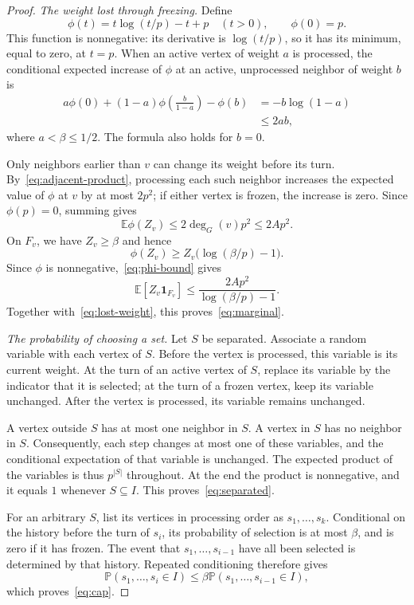 \documentclass[11pt]{article}
\numberwithin{equation}{section}
\theoremstyle{remark}
\newcommand{\E}{\mathbb E}
\newcommand{\Pp}{\mathbb P}
\newcommand{\ind}{\mathbf 1}
\begin{document}
\begin{proof}
\smallskip
\noindent\emph{The weight lost through freezing.}
Define
\[
 \phi(t)=t\log(t/p)-t+p\quad(t>0),\qquad\phi(0)=p.
\]
This function is nonnegative: its derivative is $\log(t/p)$, so it has its minimum, equal to zero, at $t=p$. When an active vertex of weight $a$ is processed, the conditional expected increase of $\phi$ at an active, unprocessed neighbor of weight $b$ is
\begin{align*}
 a\phi(0)+(1-a)\phi\!\left(\frac{b}{1-a}\right)-\phi(b)
 &=-b\log(1-a)\\
 &\le2ab,
\end{align*}
where $a<\beta\le1/2$. The formula also holds for $b=0$.

Only neighbors earlier than $v$ can change its weight before its turn. By~\eqref{eq:adjacent-product}, processing each such neighbor increases the expected value of $\phi$ at $v$ by at most $2p^2$; if either vertex is frozen, the increase is zero. Since $\phi(p)=0$, summing gives
\begin{equation}\label{eq:phi-bound}
 \E\phi(Z_v)\le2\deg_G(v)p^2\le2Ap^2.
\end{equation}
On $F_v$, we have $Z_v\ge\beta$ and hence
\[
 \phi(Z_v)\ge Z_v\bigl(\log(\beta/p)-1\bigr).
\]
Since $\phi$ is nonnegative,~\eqref{eq:phi-bound} gives
\[
 \E[Z_v\ind_{F_v}]
 \le\frac{2Ap^2}{\log(\beta/p)-1}.
\]
Together with~\eqref{eq:lost-weight}, this proves~\eqref{eq:marginal}.

\smallskip
\noindent\emph{The probability of choosing a set.}
Let $S$ be separated. Associate a random variable with each vertex of $S$. Before the vertex is processed, this variable is its current weight. At the turn of an active vertex of $S$, replace its variable by the indicator that it is selected; at the turn of a frozen vertex, keep its variable unchanged. After the vertex is processed, its variable remains unchanged.

A vertex outside $S$ has at most one neighbor in $S$. A vertex in $S$ has no neighbor in $S$. Consequently, each step changes at most one of these variables, and the conditional expectation of that variable is unchanged. The expected product of the variables is thus $p^{|S|}$ throughout. At the end the product is nonnegative, and it equals $1$ whenever $S\subseteq I$. This proves~\eqref{eq:separated}.

For an arbitrary $S$, list its vertices in processing order as $s_1,\ldots,s_k$. Conditional on the history before the turn of $s_i$, its probability of selection is at most $\beta$, and is zero if it has frozen. The event that $s_1,\ldots,s_{i-1}$ have all been selected is determined by that history. Repeated conditioning therefore gives
\[
 \Pp(s_1,\ldots,s_i\in I)
 \le\beta\Pp(s_1,\ldots,s_{i-1}\in I),
\]
which proves~\eqref{eq:cap}.
\end{proof}
\end{document}
